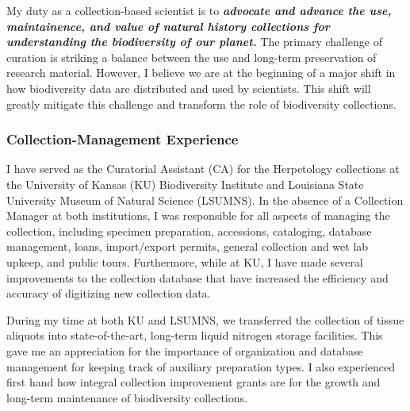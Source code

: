 My duty as a collection-based scientist is to \textbf{\textit{advocate and
advance the use, maintainence, and value of natural history collections for
understanding the biodiversity of our planet.}}
The primary challenge of curation is striking a balance between the use and
long-term preservation of research material.
However, I believe we are at the beginning of a major shift in how
biodiversity data are distributed and used by scientists.
This shift will greatly mitigate this challenge and transform the role of
biodiversity collections.


\subsubsection*{Collection-Management Experience}
I have served as the Curatorial Assistant (CA) for the Herpetology collections
at the University of Kansas (KU) Biodiversity Institute and Louisiana State
University Museum of Natural Science (LSUMNS).
In the absence of a Collection Manager at both institutions, I was responsible
for all aspects of managing the collection, including specimen preparation,
accessions, cataloging, database management, loans, import/export permits, 
general collection and wet lab upkeep, and public tours.
Furthermore, while at KU, I have made several improvements to the collection
database that have increased the efficiency and accuracy of digitizing new
collection data.

During my time at both KU and LSUMNS, we transferred the collection of tissue
aliquots into state-of-the-art, long-term liquid nitrogen storage facilities.
This gave me an appreciation for the importance of organization and database
management for keeping track of auxiliary preparation types.
I also experienced first hand how integral collection improvement grants are
for the growth and long-term maintenance of biodiversity collections.


